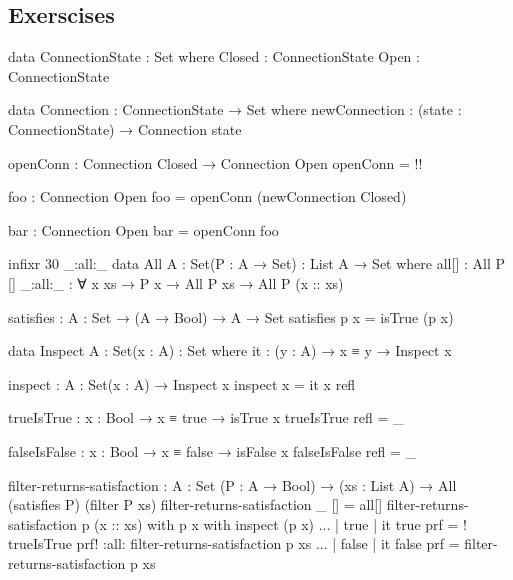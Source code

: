 \subsection{Exerscises}


\begin{code}
data ConnectionState : Set where
  Closed : ConnectionState
  Open : ConnectionState

data Connection : ConnectionState → Set where
  newConnection : (state : ConnectionState) → Connection state

openConn : Connection Closed → Connection Open
openConn = {!!}

foo : Connection Open
foo = openConn (newConnection Closed)

bar : Connection Open
bar = openConn  foo



\end{code}


\begin{code}
infixr 30 _:all:_
data All {A : Set}(P : A → Set) : List A → Set where
  all[] : All P []
  _:all:_ : ∀ {x xs} → P x → All P xs → All P (x :: xs)

satisfies : {A : Set} → (A → Bool) → A → Set
satisfies p x = isTrue (p x)

data Inspect {A : Set}(x : A) : Set where
  it : (y : A) → x ≡ y → Inspect x

inspect : {A : Set}(x : A) → Inspect x
inspect x = it x refl

trueIsTrue : {x : Bool} → x ≡ true → isTrue x
trueIsTrue refl = _

falseIsFalse : {x : Bool} → x ≡ false → isFalse x
falseIsFalse refl = _

filter-returns-satisfaction : {A : Set} (P : A → Bool) → (xs : List A) →  All (satisfies P) (filter P xs)
filter-returns-satisfaction _ [] = all[]
filter-returns-satisfaction p (x :: xs) with p x with inspect (p x)
... | true | it true prf  = {! trueIsTrue prf!} :all:  filter-returns-satisfaction p xs
... | false | it false prf =  filter-returns-satisfaction p xs
\end{code}
